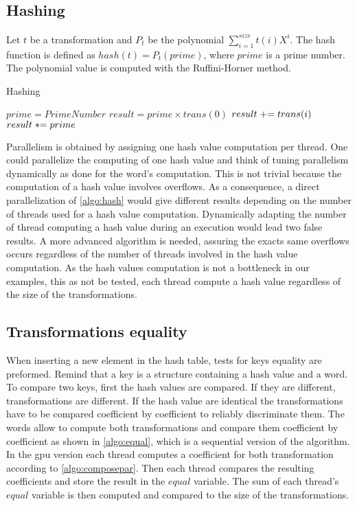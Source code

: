 {\subsection{Hashing}
\label{part:hash}
Let $t$ be a transformation and $P_{t}$ be the polynomial $\displaystyle\sum_{i=1}^{size} t(i)X^i$. The hash function is defined as $hash(t) = P_{t}(prime)$, where $prime$ is a prime number.
The polynomial value is computed with the Ruffini-Horner method.
\begin{algorithm}
\caption{Hashing}
\label{algo:hash}
\begin{algorithmic}
\STATE $prime = PrimeNumber$
\STATE $result = prime \times trans(0)$
\STATE $\switch result += trans(i)$
\STATE $\switch result *= prime$
\ENDFOR
\end{algorithmic}
\end{algorithm}
Parallelism is obtained by assigning one hash value computation per thread.
One could parallelize the computing of one hash value and think of tuning parallelism dynamically as done for the word's computation. 
This is not trivial because the computation of a hash value involves overflows. 
As a consequence, a direct parallelization of \autoref{algo:hash} would give different results depending on the number of threads used for a hash value computation. 
Dynamically adapting the number of thread computing a hash value during an execution would lead two false results. 
A more advanced algorithm is needed, assuring the exacts same overflows occurs regardless of the number of threads involved in the hash value computation. 
As the hash values computation is not a bottleneck in our examples, this as not be tested, each thread compute a hash value regardless of the size of the transformations.


\subsection{Transformations equality}
\label{part:equality}
When inserting a new element in the hash table, tests for keys equality are preformed.
Remind that a key is a structure containing a hash value and a word.
To compare two keys, first the hash values are compared. If they are different, transformations are different.
If the hash value are identical the transformations have to be compared coefficient by coefficient to reliably discriminate them. 
The words allow to compute both transformations and compare them coefficient by coefficient as shown in \autoref{algo:equal}, which is a sequential version of the algorithm.
In the \gls{gpu} version each thread computes a coefficient for both transformation according to \autoref{algo:composepar}. 
Then each thread compares the resulting coefficients and store the result in the $equal$ variable. 
The sum of each thread's $equal$ variable is then computed and compared to the size of the transformations.

}
